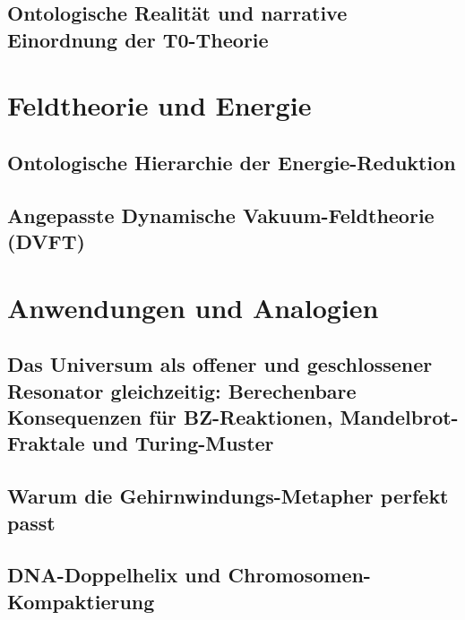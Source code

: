 \documentclass[11pt,openright,twoside]{book}
\begin{document}
\chapter{Ontologische Realität und narrative Einordnung der T0-Theorie}


\part{Feldtheorie und Energie}

\chapter{Ontologische Hierarchie der Energie-Reduktion}


\chapter{Angepasste Dynamische Vakuum-Feldtheorie (DVFT)}


\part{Anwendungen und Analogien}

\chapter{Das Universum als offener und geschlossener Resonator gleichzeitig: Berechenbare Konsequenzen für BZ-Reaktionen, Mandelbrot-Fraktale und Turing-Muster}


\chapter{Warum die Gehirnwindungs-Metapher perfekt passt}


\chapter{DNA-Doppelhelix und Chromosomen-Kompaktierung}

\end{document}
